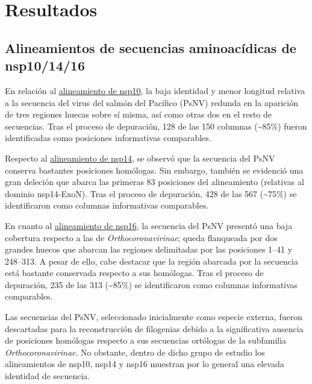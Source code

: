 \section{Resultados}

\subsection{Alineamientos de secuencias aminoacídicas de nsp10/14/16}

En relación al \href{https://htmlpreview.github.io/?https://github.com/villena-francis/bachelors_thesis/blob/main/data/align_no_ext_sp/nsp10/Trim_Alig_All_nsp10.html}{alineamiento de nsp10}, 
la baja identidad y menor longitud relativa a la secuencia del virus del salmón del Pacífico 
(PsNV) redunda en la aparición de tres regiones huecas sobre sí misma, así como 
otras dos en el resto de secuencias. Tras el proceso de depuración, 128 de 
las 150 columnas (\~{}85\%) fueron identificadas como posiciones informativas 
comparables.

Respecto al \href{https://htmlpreview.github.io/?https://github.com/villena-francis/bachelors_thesis/blob/main/data/align_no_ext_sp/nsp14/Trim_Alig_All_nsp14.html}{alineamiento de nsp14}, se observó que la 
secuencia del PsNV conserva bastantes posiciones homólogas. Sin embargo, 
también se evidenció una gran deleción que abarca las primeras 83 posiciones
del alineamiento (relativas al dominio nsp14-ExoN). Tras el proceso de 
depuración, 428 de las 567 (\~{}75\%) se identificaron como columnas 
informativas comparables.

En cuanto al \href{https://htmlpreview.github.io/?https://github.com/villena-francis/bachelors_thesis/blob/main/data/align_no_ext_sp/nsp16/Trim_Alig_All_nsp16.html}{alineamiento de nsp16}, la secuencia del 
PsNV presentó una baja cobertura respecto a las de 
\textit{Orthocoronavirinae}; queda flanqueada por dos grandes huecos que 
abarcan las regiones delimitadas por las posiciones 1--41 y 248--313. A pesar 
de ello, cabe destacar que la región abarcada por la secuencia está bastante
conservada respecto a sus homólogas. Tras el proceso de depuración, 235 de 
las 313 (\~{}85\%) se identificaron como columnas informativas comparables.

Las secuencias del PsNV, seleccionado inicialmente como especie externa, 
fueron descartadas para la reconstrucción de filogenias debido a la 
significativa ausencia de posiciones homólogas respecto a sus secuencias 
ortólogas de la subfamilia \textit{Orthocoronavirinae}. No obstante, dentro 
de dicho grupo de estudio los alineamientos de nsp10, nsp14 y nsp16 muestran
por lo general una elevada identidad de secuencia.

